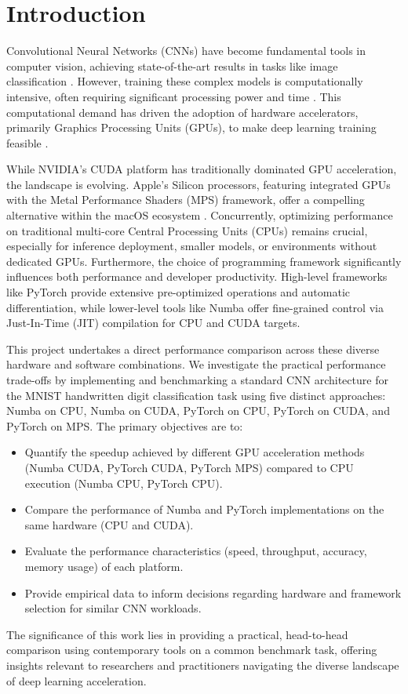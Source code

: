 \documentclass[conference]{IEEEtran} %
\begin{document}

\section{Introduction}
\label{sec:introduction}
Convolutional Neural Networks (CNNs) have become fundamental tools in computer vision, achieving state-of-the-art results in tasks like image classification \cite{Krizhevsky2012}. However, training these complex models is computationally intensive, often requiring significant processing power and time \cite{Sze2017}. This computational demand has driven the adoption of hardware accelerators, primarily Graphics Processing Units (GPUs), to make deep learning training feasible \cite{Krizhevsky2012}.

While NVIDIA's CUDA platform has traditionally dominated GPU acceleration, the landscape is evolving. Apple's Silicon processors, featuring integrated GPUs with the Metal Performance Shaders (MPS) framework, offer a compelling alternative within the macOS ecosystem \cite{Hubner2025}. Concurrently, optimizing performance on traditional multi-core Central Processing Units (CPUs) remains crucial, especially for inference deployment, smaller models, or environments without dedicated GPUs. Furthermore, the choice of programming framework significantly influences both performance and developer productivity. High-level frameworks like PyTorch provide extensive pre-optimized operations and automatic differentiation, while lower-level tools like Numba offer fine-grained control via Just-In-Time (JIT) compilation for CPU and CUDA targets.

This project undertakes a direct performance comparison across these diverse hardware and software combinations. We investigate the practical performance trade-offs by implementing and benchmarking a standard CNN architecture for the MNIST handwritten digit classification task \cite{LeCun1998} using five distinct approaches: Numba on CPU, Numba on CUDA, PyTorch on CPU, PyTorch on CUDA, and PyTorch on MPS. The primary objectives are to:
\begin{itemize}
    \item Quantify the speedup achieved by different GPU acceleration methods (Numba CUDA, PyTorch CUDA, PyTorch MPS) compared to CPU execution (Numba CPU, PyTorch CPU).
    \item Compare the performance of Numba and PyTorch implementations on the same hardware (CPU and CUDA).
    \item Evaluate the performance characteristics (speed, throughput, accuracy, memory usage) of each platform.
    \item Provide empirical data to inform decisions regarding hardware and framework selection for similar CNN workloads.
\end{itemize}
The significance of this work lies in providing a practical, head-to-head comparison using contemporary tools on a common benchmark task, offering insights relevant to researchers and practitioners navigating the diverse landscape of deep learning acceleration.
\end{document}
